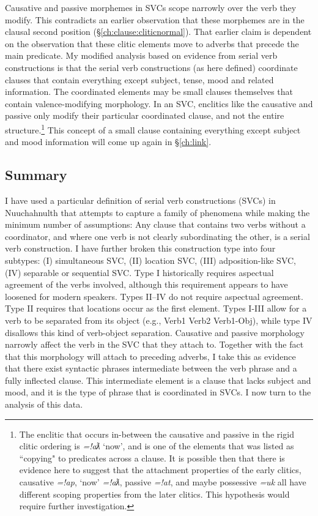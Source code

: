 Causative and passive morphemes in SVCs scope narrowly over the verb they modify. This contradicts an earlier observation that these morphemes are in the clausal second position (\S\ref{ch:clause:cliticnormal}). That earlier claim is dependent on the observation that these clitic elements move to adverbs that precede the main predicate. My modified analysis based on evidence from serial verb constructions is that the serial verb constructions (as here defined) coordinate clauses that contain everything except subject, tense, mood and related information. The coordinated elements may be small clauses themselves that contain valence-modifying morphology. In an SVC, enclitics like the causative and passive only modify their particular coordinated clause, and not the entire structure.\footnote{The enclitic that occurs in-between the causative and passive in the rigid clitic ordering is \textit{=!aƛ} `now', and is one of the elements that was listed as ``copying" to predicates across a clause. It is possible then that there is evidence here to suggest that the attachment properties of the early clitics, causative \textit{=!ap}, `now' \textit{=!aƛ}, passive \textit{=!at}, and maybe possessive \textit{=uk} all have different scoping properties from the later clitics. This hypothesis would require further investigation.} This concept of a small clause containing everything except subject and mood information will come up again in \S\ref{ch:link}.

\subsection{Summary}

I have used a particular definition of serial verb constructions (SVCs) in Nuuchahnulth that attempts to capture a family of phenomena while making the minimum number of assumptions: Any clause that contains two verbs without a coordinator, and where one verb is not clearly subordinating the other, is a serial verb construction. I have further broken this construction type into four subtypes: (I) simultaneous SVC, (II) location SVC, (III) adposition-like SVC, (IV) separable or sequential SVC. Type I historically requires aspectual agreement of the verbs involved, although this requirement appears to have loosened for modern speakers. Types II--IV do not require aspectual agreement. Type II requires that locations occur as the first element. Types I-III allow for a verb to be separated from its object (e.g., Verb1 Verb2 Verb1-Obj), while type IV disallows this kind of verb-object separation. Causative and passive morphology narrowly affect the verb in the SVC that they attach to. Together with the fact that this morphology will attach to preceding adverbs, I take this as evidence that there exist syntactic phrases intermediate between the verb phrase and a fully inflected clause. This intermediate element is a clause that lacks subject and mood, and it is the type of phrase that is coordinated in SVCs. I now turn to the analysis of this data.

